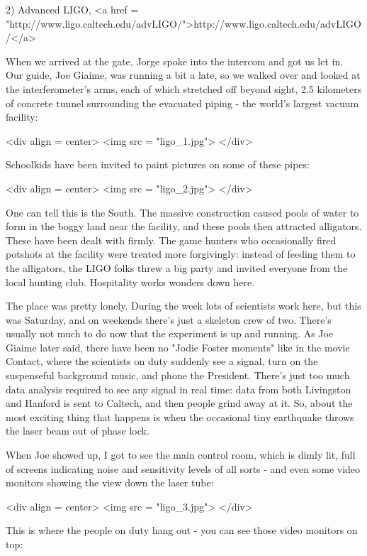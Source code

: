 2) Advanced LIGO, <a href =
"http://www.ligo.caltech.edu/advLIGO/">http://www.ligo.caltech.edu/advLIGO/</a>

When we arrived at the gate, Jorge spoke into the intercom and got 
us let in.  Our guide, Joe Giaime, was running a bit a late, 
so we walked over and looked at the interferometer's arms, each 
of which stretched off beyond sight, 2.5 kilometers of concrete 
tunnel surrounding the evacuated piping - the world's largest vacuum
facility:

<div align = center>
<img src = "ligo_1.jpg">
</div>

Schoolkids have been invited to paint pictures on some of these
pipes:

<div align = center>
<img src = "ligo_2.jpg">
</div>

One can tell this is the South.  The massive construction caused
pools of water to form in the boggy land near the facility, and
these pools then attracted alligators.  These have been dealt with firmly.  
The game hunters who occasionally fired potshots at the facility were 
treated more forgivingly: instead of feeding them to the alligators, 
the LIGO folks threw a big party and invited everyone from the local 
hunting club.  Hospitality works wonders down here.

The place was pretty lonely.  During the week lots of scientists work
here, but this was Saturday, and on weekends there's just a skeleton 
crew of two.  There's usually not much to do now that the experiment 
is up and running.   As Joe Giaime later said, there have been no "Jodie 
Foster moments" like in the movie Contact, where the scientists on 
duty suddenly see a signal, turn on the suspenseful background music, 
and phone the President.   There's just too much data analysis 
required to see any signal in real time: data from both Livingston and 
Hanford is sent to Caltech, and then people grind away at it.  So, 
about the most exciting thing that happens is when the occasional tiny
earthquake throws the laser beam out of phase lock.

When Joe showed up, I got to see the main control room, which 
is dimly lit, full of screens indicating noise and sensitivity
levels of all sorts - and even some video monitors showing the view 
down the laser tube:

<div align = center>
<img src = "ligo_3.jpg">
</div>

This is where the people on duty hang out - you can see those video
monitors on top:

